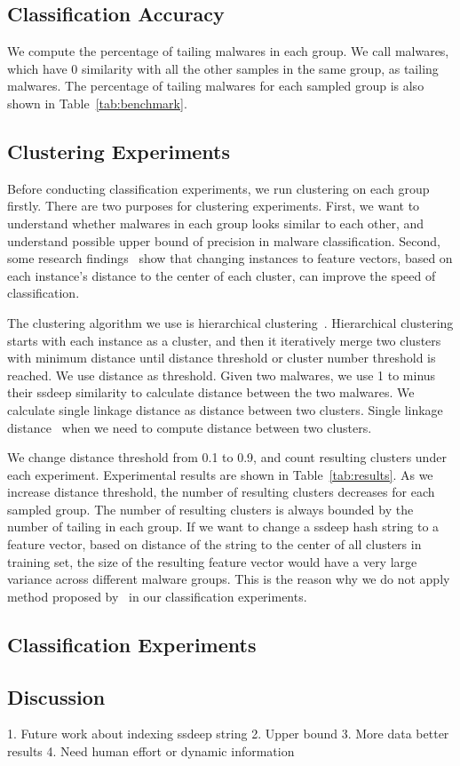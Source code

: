 \subsection{Classification Accuracy}


We compute the percentage of tailing malwares in each group. 
We call malwares, which have 0 similarity with all the other samples in the same group, as tailing malwares. 
The percentage of tailing malwares for each sampled group is also shown in Table~\ref{tab:benchmark}. 

\subsection{Clustering Experiments}



Before conducting classification experiments, 
we run clustering on each group firstly. 
There are two purposes for clustering experiments.
First, we want to understand whether malwares in each group looks similar to each other, 
and understand possible upper bound of precision in malware classification.
Second, some research findings~\cite{clustering-purpose} show that changing instances to feature vectors, 
based on each instance’s distance to the center of each cluster, 
can improve the speed of classification.  

The clustering algorithm we use is hierarchical clustering~\cite{hcluster}.
Hierarchical clustering starts with each instance as a cluster, 
and then it iteratively merge two clusters with minimum distance 
until distance threshold or cluster number threshold is reached. 
We use distance as threshold. 
Given two malwares, 
we use 1 to minus their ssdeep similarity to calculate distance between the two malwares. 
We calculate single linkage distance as distance between two clusters. 
Single linkage
distance~\cite{single-link} when we need to compute distance between two clusters. 

We change distance threshold from 0.1 to 0.9, 
and count resulting clusters under each experiment. 
Experimental results are shown in Table~\ref{tab:results}. 
As we increase distance threshold, the number of resulting clusters decreases for each sampled group. 
The number of resulting clusters is always bounded by the number of tailing in each group. 
If we want to change a ssdeep hash string to a feature vector, 
based on distance of the string to the center of all clusters in training set, 
the size of the resulting feature vector would have a very large variance across different malware groups. 
This is the reason why we do not apply method proposed by~\citet{clustering-purpose} in our classification experiments. 



\subsection{Classification Experiments}


\subsection{Discussion}
1. Future work about indexing ssdeep string
2. Upper bound
3. More data better results
4. Need human effort or dynamic information 